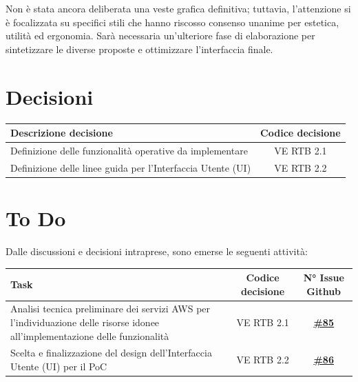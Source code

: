 \documentclass[a4paper,12pt]{article}
\newcommand{\ignoreglossary}{}
\begin{document}
Non è stata ancora deliberata una veste grafica definitiva; tuttavia, l'attenzione si è focalizzata su specifici stili che hanno riscosso consenso unanime per estetica, utilità ed ergonomia. Sarà necessaria un'ulteriore fase di elaborazione per sintetizzare le diverse proposte e ottimizzare l'interfaccia finale.

\section{Decisioni}
\begin{center}
\small
\renewcommand{\arraystretch}{1.2} 
\begin{tabular}{|p{}|c|}
\hline
\rowcolor{gray!60} 
\textbf{Descrizione decisione} & \textbf{Codice decisione} \\
\hline
\rowcolor{white}
Definizione delle funzionalità operative da implementare & VE \ignoreglossary{RTB} 2.1 \\
\hline
\rowcolor{gray!20}
Definizione delle linee guida per l'Interfaccia Utente (UI) &  VE \ignoreglossary{RTB} 2.2 \\
\hline
\end{tabular}
\end{center}

\section{To Do}
Dalle discussioni e decisioni intraprese, sono emerse le seguenti attività:

\begin{center}
\small
\renewcommand{\arraystretch}{1.2} 
\begin{tabular}{|p{}|c|c|}
\hline
\rowcolor{gray!60} 
\textbf{Task} & \textbf{Codice decisione} & \textbf{N° Issue Github} \\
\hline
\rowcolor{white}
Analisi tecnica preliminare dei servizi AWS per l'individuazione delle risorse idonee all'implementazione delle funzionalità & VE \ignoreglossary{RTB} 2.1 & \href{https://github.com/SWE-BitByBit/SWE-docs/issues/85}{\textbf{\#85}} \\
\hline
\rowcolor{gray!20}
Scelta e finalizzazione del design dell'Interfaccia Utente (UI) per il PoC & VE \ignoreglossary{RTB} 2.2 & \href{https://github.com/SWE-BitByBit/SWE-docs/issues/86}{\textbf{\#86}} \\
\hline
\end{tabular}
\end{center}
\end{document}
